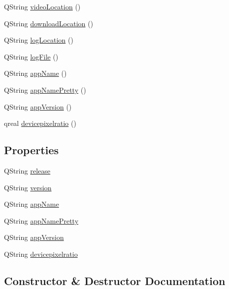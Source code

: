 \begin{DoxyCompactItemize}
\item 
Q\+String \mbox{\hyperlink{classOS_afdfd88fe0b70d4ed51508e7dc364b1d4}{video\+Location}} ()
\item 
Q\+String \mbox{\hyperlink{classOS_a0dac0a86aca0d89d27b9596999506713}{download\+Location}} ()
\item 
Q\+String \mbox{\hyperlink{classOS_a5f0bcd7c973d5875be519ec3a06629f2}{log\+Location}} ()
\item 
Q\+String \mbox{\hyperlink{classOS_a85848812c46025d92b9a061df85d9bce}{log\+File}} ()
\item 
Q\+String \mbox{\hyperlink{classOS_a414805ecb488dd84a111fb2c8c6b9401}{app\+Name}} ()
\item 
Q\+String \mbox{\hyperlink{classOS_af545da4fea44bc32a873f7021498b9fc}{app\+Name\+Pretty}} ()
\item 
Q\+String \mbox{\hyperlink{classOS_ad216acfae668255c7e307e965e5e3a50}{app\+Version}} ()
\item 
qreal \mbox{\hyperlink{classOS_abec33b96eb8c7def86f6f918dc1849c0}{devicepixelratio}} ()
\end{DoxyCompactItemize}
\subsection*{Properties}
\begin{DoxyCompactItemize}
\item 
Q\+String \mbox{\hyperlink{classOS_ac78395d05ca770df0e6136dca18cf682}{release}}
\item 
Q\+String \mbox{\hyperlink{classOS_af9d3ad8c99dd34d874634eae3163dcc3}{version}}
\item 
Q\+String \mbox{\hyperlink{classOS_af9d6295c5361884c9c7c25b13db70720}{app\+Name}}
\item 
Q\+String \mbox{\hyperlink{classOS_a5ecf65ef8f4ac491323d1590c2cb4e67}{app\+Name\+Pretty}}
\item 
Q\+String \mbox{\hyperlink{classOS_a8162949b8a268b409967ae356947e059}{app\+Version}}
\item 
Q\+String \mbox{\hyperlink{classOS_aa40d035f4f4b1f67c6c103cd3b3cfc08}{devicepixelratio}}
\end{DoxyCompactItemize}


\subsection{Constructor \& Destructor Documentation}
\mbox{\label{classOS_aee121bb510546f335b13791c7c7b4330}} 
